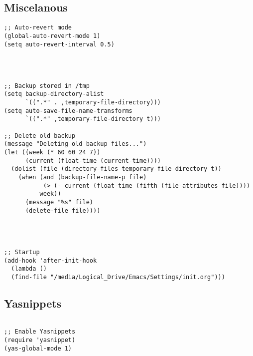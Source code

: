 \documentclass[11pt]{article}
\begin{document}
\subsection{Miscelanous}
\label{sec:org1631a6f}
\begin{verbatim}
;; Auto-revert mode
(global-auto-revert-mode 1)
(setq auto-revert-interval 0.5)




;; Backup stored in /tmp
(setq backup-directory-alist
      `((".*" . ,temporary-file-directory)))
(setq auto-save-file-name-transforms
      `((".*" ,temporary-file-directory t)))

;; Delete old backup
(message "Deleting old backup files...")
(let ((week (* 60 60 24 7))
      (current (float-time (current-time))))
  (dolist (file (directory-files temporary-file-directory t))
    (when (and (backup-file-name-p file)
	       (> (- current (float-time (fifth (file-attributes file))))
		  week))
      (message "%s" file)
      (delete-file file))))




;; Startup
(add-hook 'after-init-hook 
  (lambda () 
  (find-file "/media/Logical_Drive/Emacs/Settings/init.org")))

\end{verbatim}

\subsection{Yasnippets}
\label{sec:orgcd0c8bd}

\begin{verbatim}

;; Enable Yasnippets
(require 'yasnippet)
(yas-global-mode 1)

\end{verbatim}
\end{document}
